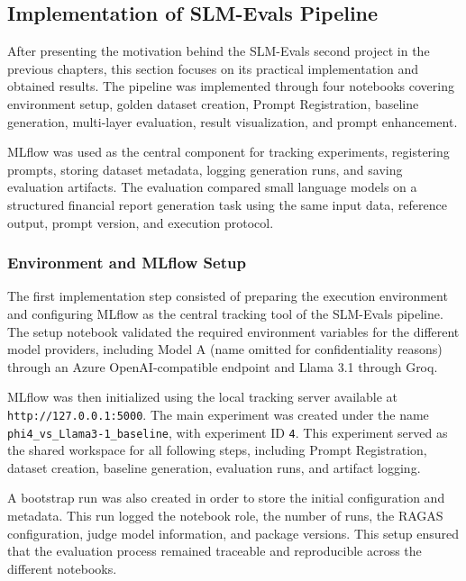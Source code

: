 \subsection{Implementation of SLM-Evals Pipeline}
After presenting the motivation behind the SLM-Evals second project in the previous chapters, this section focuses on its practical implementation and obtained results. The pipeline was implemented through four notebooks covering environment setup, golden dataset creation, Prompt Registration, baseline generation, multi-layer evaluation, result visualization, and prompt enhancement.

MLflow was used as the central component for tracking experiments, registering prompts, storing dataset metadata, logging generation runs, and saving evaluation artifacts. The evaluation compared small language models on a structured financial report generation task using the same input data, reference output, prompt version, and execution protocol.

\subsubsection{ Environment and MLflow Setup}

The first implementation step consisted of preparing the execution environment and configuring MLflow as the central tracking tool of the SLM-Evals pipeline. The setup notebook validated the required environment variables for the different model providers, including Model A (name omitted for confidentiality reasons) through an Azure OpenAI-compatible endpoint and Llama 3.1 through Groq.

MLflow was then initialized using the local tracking server available at \texttt{http://127.0.0.1:5000}. The main experiment was created under the name \texttt{phi4\_vs\_Llama3-1\_baseline}, with experiment ID \texttt{4}. This experiment served as the shared workspace for all following steps, including Prompt Registration, dataset creation, baseline generation, evaluation runs, and artifact logging.

A bootstrap run was also created in order to store the initial configuration and metadata. This run logged the notebook role, the number of runs, the RAGAS configuration, judge model information, and package versions. This setup ensured that the evaluation process remained traceable and reproducible across the different notebooks.

